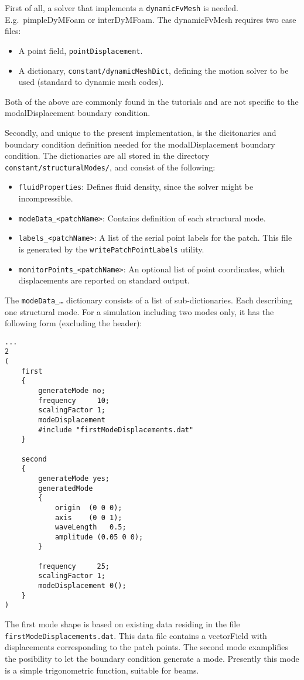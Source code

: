 First of all, a solver that implements a \texttt{dynamicFvMesh} is needed.
E.g.~pimpleDyMFoam or interDyMFoam. The dynamicFvMesh requires two case files:

\begin{itemize}
    \item A point field, \texttt{pointDisplacement}.
    \item A dictionary, \texttt{constant/dynamicMeshDict}, defining the
          motion solver to be used (standard to dynamic mesh codes).
\end{itemize}

Both of the above are commonly found in the tutorials and are not specific to the
modalDisplacement boundary condition.

Secondly, and unique to the present implementation, is the dicitonaries and
boundary condition definition needed for the modalDisplacement boundary
condition. The dictionaries are all stored in the directory
\texttt{constant/structuralModes/}, and consist of the following:

\begin{itemize}
    \item \texttt{fluidProperties}: Defines fluid density, since the solver might be incompressible.
    \item \texttt{modeData\_<patchName>}: Contains definition of each structural mode.
    \item \texttt{labels\_<patchName>}: A list of the serial point labels for the patch. This file is
        generated by the \texttt{writePatchPointLabels} utility.
    \item \texttt{monitorPoints\_<patchName>}: An optional list of point coordinates, which
        displacements are reported on standard output.
\end{itemize}

The \texttt{modeData\_\ldots} dictionary consists of a list of sub-dictionaries. Each describing
one structural mode. For a simulation including two modes only, it has the following form (excluding the header):

\begin{verbatim}
...
2
(
    first
    {
        generateMode no;
        frequency     10;
        scalingFactor 1;
        modeDisplacement
        #include "firstModeDisplacements.dat"
    }

    second
    {
        generateMode yes;
        generatedMode
        {
            origin  (0 0 0);
            axis    (0 0 1);
            waveLength   0.5;
            amplitude (0.05 0 0);
        }

        frequency     25;
        scalingFactor 1;
        modeDisplacement 0();
    }
)
\end{verbatim}

The first mode shape is based on existing data residing in the file \texttt{firstModeDisplacements.dat}.
This data file contains a vectorField with displacements corresponding to the patch points. The second
mode examplifies the posibility to let the boundary condition generate a mode. Presently this mode is
a simple trigonometric function, suitable for beams.
